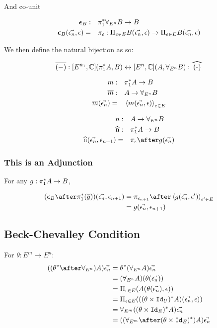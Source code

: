 \documentclass{report}
\newcommand\env[0]{\vec{\e_n}}
\newcommand\allEn[0]{\forall_{E^n}}
\newcommand\allEm[0]{\forall_{E^m}}
\newcommand\counit[1]{\boldsymbol{\epsilon}_{#1}}
\begin{document}
And co-unit


\begin{align}
    \counit{B} : &\quad \pstar\allEn B \rightarrow B\\
    \counit{B}(\env, \e) =&\quad \pi_\e : \Pi_{e\in E}B(\env, \e)\rightarrow \Pi_{e\in E}B(\env, \e)
\end{align}


We then define the natural bijection as so:

\begin{equation}
    \bar{(-)}: [E^{n_1}, \C](\pstar A, B) \leftrightarrow [E^n,\C] (A, \allEn B): \widehat{(-)}
\end{equation}

\begin{align}
    m:&\quad \pstar A \rightarrow B\\
    \bar{m}:&\quad A\rightarrow \allEn B\\
    \bar{m}(\env) =&\quad \finpr{m(\env, \e)}{e\in E}
\end{align}


\begin{align}
    n:&\quad A \rightarrow \allEn B\\
    \widehat{n}:&\quad \pstar A\rightarrow B\\
    \widehat{n}(\env, \e_{n+1}) =&\quad\pi_\e\after g(\env)
\end{align}

\subsubsection{This is an Adjunction}
For any $g: \pi_1^* A \rightarrow B$,

\begin{align}
    (\counit{B}\after\pstar(\bar{g}))(\env, \e_{n+1}) & = \pi_{\e_{n+1}}\after\finpr{g(\env, \e')}{\e'\in E}\\
    &= g(\env, \e_{n+1})
\end{align}

\subsection{Beck-Chevalley Condition}

For $\theta: E^m \rightarrow E^n$:
\begin{align}
    ((\theta\star\after\allEn)A)\env &= \theta\star(\allEn A)\env\\
    &= (\allEn A)(\theta(\env))\\
    &= \Pi_{\e\in E}(A(\theta(\env), \e))\\
    &= \Pi_{\e\in E}(((\theta\times \Id{U})\star A)(\env, \e))\\
    &= \allEm((\theta\times\Id{E})\star A)\env\\
    &= ((\allEm\after(\theta\times\Id{E})\star)A)\env
\end{align}
\end{document}
